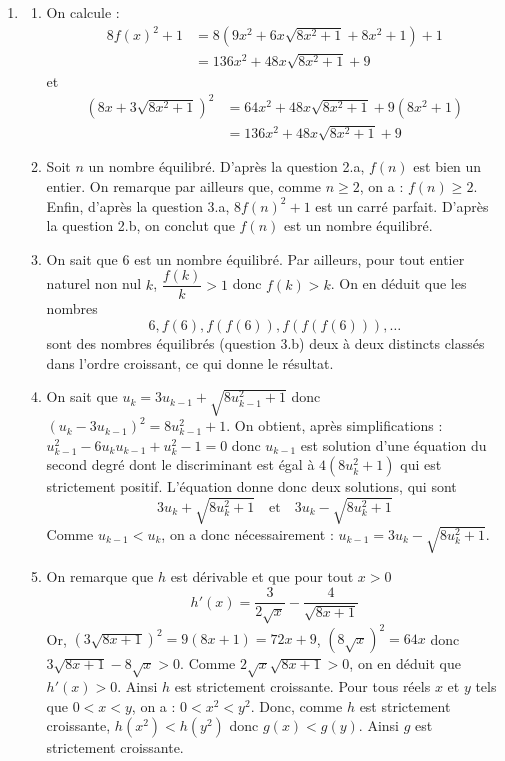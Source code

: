 \begin{enumerate}
\item \textbf{}
\begin{enumerate}
    \item On calcule :
    \begin{align*}
    8f(x)^2 + 1 &= 8\left(9x^2 + 6x\sqrt{8x^2 + 1} + 8x^2 + 1\right) + 1 \\
    &= 136x^2 + 48x\sqrt{8x^2 + 1} + 9
    \end{align*}
    et
    \begin{align*}
    (8x + 3\sqrt{8x^2 + 1})^2 &= 64x^2 + 48x\sqrt{8x^2 + 1} + 9(8x^2 + 1) \\
    &= 136x^2 + 48x\sqrt{8x^2 + 1} + 9
    \end{align*}
    
    \item Soit $n$ un nombre équilibré. D'après la question 2.a, $f(n)$ est bien un entier. On remarque par ailleurs que, comme $n \geq 2$, on a : $f(n) \geq 2$. Enfin, d'après la question 3.a, $8f(n)^2 + 1$ est un carré parfait. D'après la question 2.b, on conclut que $f(n)$ est un nombre équilibré.
    
    \item On sait que 6 est un nombre équilibré. Par ailleurs, pour tout entier naturel non nul $k$, $\dfrac{f(k)}{k} > 1$ donc $f(k) > k$. On en déduit que les nombres
    \[6, f(6), f(f(6)), f(f(f(6))), \ldots\]
    sont des nombres équilibrés (question 3.b) deux à deux distincts classés dans l'ordre croissant, ce qui donne le résultat.
    
    \item On sait que $u_k = 3u_{k-1} + \sqrt{8u_{k-1}^2 + 1}$ donc $(u_k - 3u_{k-1})^2 = 8u_{k-1}^2 + 1$. On obtient, après simplifications : $u_{k-1}^2 - 6u_k u_{k-1} + u_k^2 - 1 = 0$ donc $u_{k-1}$ est solution d'une équation du second degré dont le discriminant est égal à $4(8u_k^2 + 1)$ qui est strictement positif. L'équation donne donc deux solutions, qui sont
    \[3u_k + \sqrt{8u_k^2 + 1} \quad \text{et} \quad 3u_k - \sqrt{8u_k^2 + 1}\]
    Comme $u_{k-1} < u_k$, on a donc nécessairement : $u_{k-1} = 3u_k - \sqrt{8u_k^2 + 1}$.
    
    \item On remarque que $h$ est dérivable et que pour tout $x > 0$
    \[h'(x) = \frac{3}{2\sqrt{x}} - \frac{4}{\sqrt{8x + 1}}\]
    Or, $(3\sqrt{8x + 1})^2 = 9(8x + 1) = 72x + 9$, $(8\sqrt{x})^2 = 64x$ donc $3\sqrt{8x + 1} - 8\sqrt{x} > 0$. Comme $2\sqrt{x}\sqrt{8x + 1} > 0$, on en déduit que $h'(x) > 0$. Ainsi $h$ est strictement croissante. Pour tous réels $x$ et $y$ tels que $0 < x < y$, on a : $0 < x^2 < y^2$. Donc, comme $h$ est strictement croissante, $h(x^2) < h(y^2)$ donc $g(x) < g(y)$. Ainsi $g$ est strictement croissante.
    

\end{enumerate}
\end{enumerate}
